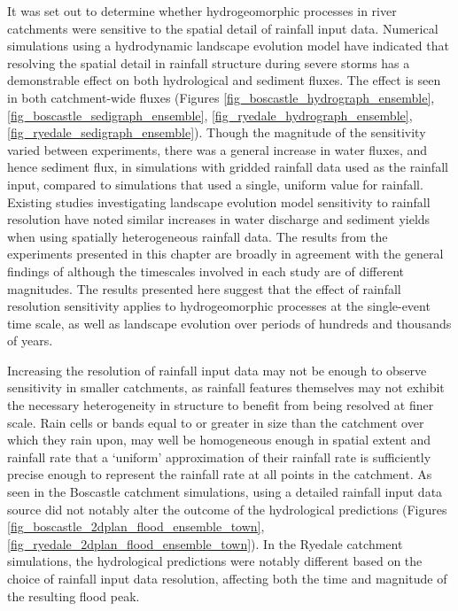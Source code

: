It was set out to determine whether hydrogeomorphic processes in river catchments were sensitive to the spatial detail of rainfall input data. Numerical simulations using a hydrodynamic landscape evolution model have indicated that resolving the spatial detail in rainfall structure during severe storms has a demonstrable effect on both hydrological and sediment fluxes. The effect is seen in both catchment-wide fluxes (Figures \ref{fig_boscastle_hydrograph_ensemble}, \ref{fig_boscastle_sedigraph_ensemble}, \ref{fig_ryedale_hydrograph_ensemble}, \ref{fig_ryedale_sedigraph_ensemble}). Though the magnitude of the sensitivity varied between experiments, there was a general increase in water fluxes, and hence sediment flux, in simulations with gridded rainfall data used as the rainfall input, compared to simulations that used a single, uniform value for rainfall. Existing studies investigating landscape evolution model sensitivity to rainfall resolution \citep{coulthard2016sensitivity} have noted similar increases in water discharge and sediment yields when using spatially heterogeneous rainfall data. The results from the experiments presented in this chapter are broadly in agreement with the general findings of \citet{coulthard2016sensitivity} although the timescales involved in each study are of different magnitudes. The results presented here suggest that the effect of rainfall resolution sensitivity applies to hydrogeomorphic processes at the single-event time scale, as well as landscape evolution over periods of hundreds and thousands of years.

Increasing the resolution of rainfall input data may not be enough to observe sensitivity in smaller catchments, as rainfall features themselves may not exhibit the necessary heterogeneity in structure to benefit from being resolved at finer scale. Rain cells or bands equal to or greater in size than the catchment over which they rain upon, may well be homogeneous enough in spatial extent and rainfall rate that a `uniform' approximation of their rainfall rate is sufficiently precise enough to represent the rainfall rate at all points in the catchment. As seen in the Boscastle catchment simulations, using a detailed rainfall input data source did not notably alter the outcome of the hydrological predictions (Figures \ref{fig_boscastle_2dplan_flood_ensemble_town}, \ref{fig_ryedale_2dplan_flood_ensemble_town}). In the Ryedale catchment simulations, the hydrological predictions were notably different based on the choice of rainfall input data resolution, affecting both the time and magnitude of the resulting flood peak. 
%

